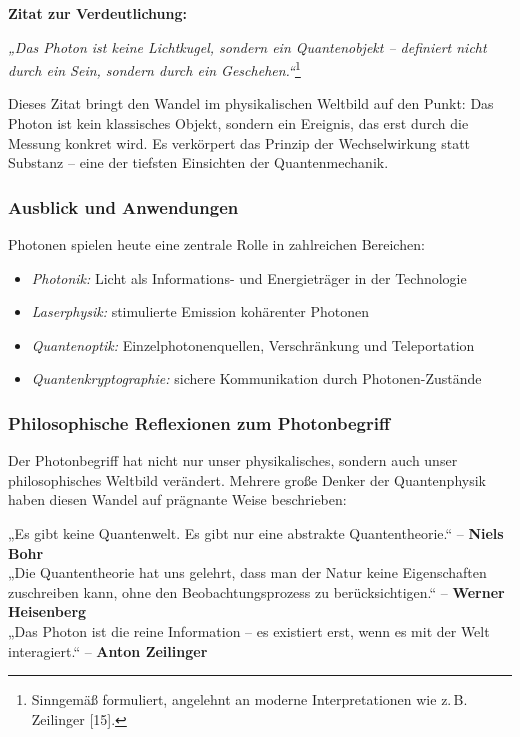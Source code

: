 \medskip

\textbf{Zitat zur Verdeutlichung:}

\begin{tcolorbox}[colback=yellow!10!white, colframe=yellow!50!black, title=Quantenobjekt statt Lichtkugel]
	\label{box:lichtkugel}
	\emph{„Das Photon ist keine Lichtkugel, sondern ein Quantenobjekt – definiert nicht durch ein Sein, sondern durch ein Geschehen.“}\footnote{Sinngemäß formuliert, angelehnt an moderne Interpretationen wie z.\,B. Zeilinger [15].}
	
	\medskip
	Dieses Zitat bringt den Wandel im physikalischen Weltbild auf den Punkt: Das Photon ist kein klassisches Objekt, sondern ein Ereignis, das erst durch die Messung konkret wird. Es verkörpert das Prinzip der Wechselwirkung statt Substanz – eine der tiefsten Einsichten der Quantenmechanik.
\end{tcolorbox}

\subsubsection{Ausblick und Anwendungen}

Photonen spielen heute eine zentrale Rolle in zahlreichen Bereichen:
\begin{itemize}
	\item \emph{Photonik:} Licht als Informations- und Energieträger in der Technologie
	\item \emph{Laserphysik:} stimulierte Emission kohärenter Photonen
	\item \emph{Quantenoptik:} Einzelphotonenquellen, Verschränkung und Teleportation
	\item \emph{Quantenkryptographie:} sichere Kommunikation durch Photonen-Zustände
\end{itemize}

\subsubsection{Philosophische Reflexionen zum Photonbegriff}

Der Photonbegriff hat nicht nur unser physikalisches, sondern auch unser philosophisches Weltbild verändert. Mehrere große Denker der Quantenphysik haben diesen Wandel auf prägnante Weise beschrieben:

\medskip

\begin{tcolorbox}[didaktikbox, title=Was ist Realität in der Quantenphysik?]
	\label{box:realitaet}
	„Es gibt keine Quantenwelt. Es gibt nur eine abstrakte Quantentheorie.“ – \textbf{Niels Bohr} \cite{bohr1934} \\
	„Die Quantentheorie hat uns gelehrt, dass man der Natur keine Eigenschaften zuschreiben kann, ohne den Beobachtungsprozess zu berücksichtigen.“ – \textbf{Werner Heisenberg} \cite{heisenberg1959} \\
	„Das Photon ist die reine Information – es existiert erst, wenn es mit der Welt interagiert.“ – \textbf{Anton Zeilinger} \cite{zeilinger2005}
\end{tcolorbox}

